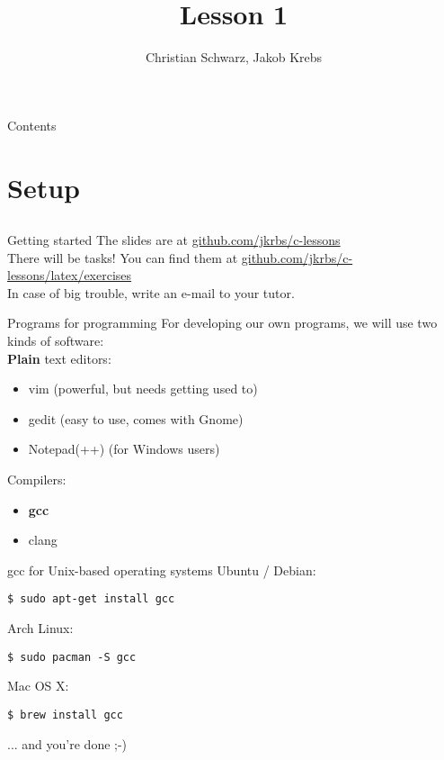 \documentclass[10pt,graphics,aspectratio=169,table]{beamer}
\title{Lesson 1}
\author{Christian Schwarz, Jakob Krebs}
\begin{document}
\maketitle

\begin{frame}{Contents}
	\tableofcontents
\end{frame}

\section{Setup}
\subsection{}

\begin{frame}{Getting started}
	The slides are at \href{https://github.com/jkrbs/c-lessons/}{github.com/jkrbs/c-lessons}\\
	\bigskip
	There will be tasks! You can find them at \href{https://github.com/jkrbs/c-lessons/tree/master/latex/exercises}{github.com/jkrbs/c-lessons/latex/exercises}\\
	\bigskip
	In case of big trouble, write an e-mail to your tutor.\\
\end{frame}

\begin{frame}{Programs for programming}
	For developing our own programs, we will use two kinds of software:\\
	\bigskip
	\textbf{Plain} text editors:
	\begin{itemize}
		\item vim (powerful, but needs getting used to)
		\item gedit (easy to use, comes with Gnome)
		\item Notepad(++) (for Windows users)
	\end{itemize}
	\bigskip
	Compilers:
	\begin{itemize}
		\item \textbf{gcc}
		\item clang
	\end{itemize}
\end{frame}

\begin{frame}[fragile]{gcc for Unix-based operating systems}
	Ubuntu / Debian:
	\begin{lstlisting}[numbers=none]
$ sudo apt-get install gcc
\end{lstlisting}
	\bigskip
	Arch Linux:
	\begin{lstlisting}[numbers=none]
$ sudo pacman -S gcc
\end{lstlisting}
	\bigskip
	Mac OS X:
	\begin{lstlisting}[numbers=none]
$ brew install gcc
\end{lstlisting}
	\bigskip
	... and you're done ;-)
\end{frame}
\end{document}
